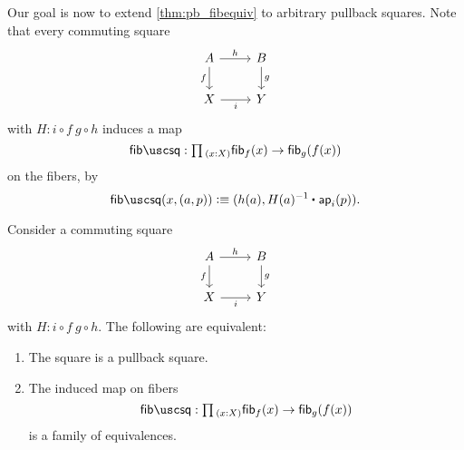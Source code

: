 Our goal is now to extend \cref{thm:pb_fibequiv} to
arbitrary pullback squares. Note that every commuting
square
\begin{equation*}
\begin{tikzcd}
A \arrow[d,swap,"f"] \arrow[r,"h"] & B \arrow[d,"g"] \\
X \arrow[r,swap,"i"] & Y
\end{tikzcd}
\end{equation*}
with $H: i\circ f ~ g \circ h$ induces a map
\begin{equation*}
\fibsquare : \prd{x:X} \fib{f}{x} \to \fib{g}{f(x)}
\end{equation*}
on the fibers, by
\begin{equation*}
\fibsquare(x,(a,p))\defeq (h(a),\ct{H(a)^{-1}}{\ap{i}{p}}).
\end{equation*}

\begin{thm}\label{cor:pb_fibequiv}
Consider a commuting square
\begin{equation*}
\begin{tikzcd}
A \arrow[d,swap,"f"] \arrow[r,"h"] & B \arrow[d,"g"] \\
X \arrow[r,swap,"i"] & Y
\end{tikzcd}
\end{equation*}
with $H: i\circ f ~ g \circ h$. The following are equivalent:
\begin{enumerate}
\item The square is a pullback square.
\item The induced map on fibers
\begin{equation*}
\fibsquare : \prd{x:X} \fib{f}{x} \to \fib{g}{f(x)}
\end{equation*}
is a family of equivalences.
\end{enumerate}
\end{thm}

